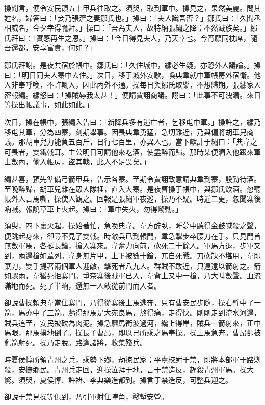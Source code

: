 操聞言，便令安民領五十甲兵往取之。須臾，取到軍中。操見之，果然美麗。問其姓名，婦答曰：「妾乃張濟之妻鄒氏也。」操曰：「夫人識吾否？」鄒氏曰：「久聞丞相威名，今夕幸得瞻拜。」操曰：「吾為夫人，故特納張繡之降；不然滅族矣。」鄒氏拜曰：「實感再生之恩。」操曰：「今日得見夫人，乃天幸也。今宵願同枕席，隨吾還都，安享富貴，何如？」

鄒氏拜謝。是夜共宿於帳中。鄒氏曰：「久住城中，繡必生疑，亦恐外人議論。」操曰：「明日同夫人寨中去住。」次日，移于城外安歇，喚典韋就中軍帳房外宿衛。他人非奉呼喚，不許輒入，因此內外不通。操每日與鄒氏取樂，不想歸期。張繡家人密報繡。繡怒曰：「操賊辱我太甚！」便請賈詡商議。詡曰：「此事不可洩漏。來日等操出帳議事，如此如此。」

次日，操在帳中，張繡入告曰：「新降兵多有逃亡者，乞移屯中軍。」操許之，繡乃移屯其軍，分為四寨，刻期舉事。因畏典韋勇猛，急切難近，乃與偏將胡車兒商議。那胡車兒力能負五百斤，日行七百里，亦異人也。當下獻計于繡曰：「典韋之可畏者，雙鐵戟耳。主公明日可請他來吃酒，使盡醉而歸。那時某便溷入他跟來軍士數內，偷入帳房，盜其戟，此人不足畏矣。」

繡甚喜，預先準備弓箭甲兵，告示各寨。至期令賈詡致意請典韋到寨，殷勤待酒。至晚醉歸，胡車兒雜在眾人隊裡，直入大寨。是夜曹操于帳中，與鄒氏飲酒。忽聽帳外人言馬嘶，操使人觀之。回報是張繡軍夜巡，操乃不疑。時近二更，忽聞寨後吶喊。報說草車上火起。操曰：「軍中失火，勿得驚動。」

須臾，四下裏火起，操始著忙，急喚典韋。韋方醉臥，睡夢中聽得金鼓喊殺之聲，便跳起身來，卻尋不見了雙戟。時敵兵已到轅門，韋急掣步卒腰刀在手。只見門首無數軍馬，各挺長鎗，搶入寨來。韋奮力向前，砍死二十餘人。軍馬方退，步軍又到，兩邊槍如葦列。韋身無片甲，上下被數十鎗，兀自死戰。刀砍缺不堪用，韋即棄刀，雙手提著兩個軍人迎敵，擊死者八九人。群賊不敢近，只遠遠以箭射之。箭如驟雨，韋猶死拒寨門。爭奈寨後賊軍已入，韋背上又中一槍，乃大叫數聲。血流滿地而死。死了半晌，還無一人敢從前門而入者。

卻說曹操賴典韋當住寨門，乃得從寨後上馬逃奔，只有曹安民步隨，操右臂中了一箭，馬亦中了三箭。虧得那馬是大宛良馬，熬得痛，走得快。剛剛走到淯水河邊，賊兵追至，安民被砍為肉泥。操急驟馬衝波過河，纔上得岸，賊兵一箭射來，正中馬眼，那馬撲地倒了。操長子曹昂，即以己所乘之馬奉操。操上馬急奔。曹昂卻被亂箭射死。操乃走脫。路逢諸將，收集殘兵。

時夏侯惇所領青州之兵，乘勢下鄉，劫掠民家；平虜校尉于禁，即將本部軍于路剿殺，安撫鄉民。青州兵走回，迎操泣拜于地，言于禁造反，趕殺青州軍馬。操大驚。須臾，夏侯惇、許褚、李典樂進都到。操言于禁造反，可整兵迎之。

卻說于禁見操等俱到，乃引軍射住陣角，鑿塹安營。

